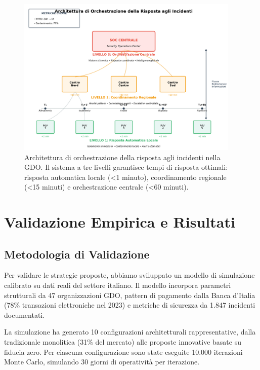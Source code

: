 \begin{figure}[htbp]
\centering
\includegraphics[width=0.95\textwidth]{thesis_figures/cap2/fig_2_4_orchestrazione.pdf}
\caption{Architettura di orchestrazione della risposta agli incidenti nella GDO. Il sistema a tre livelli garantisce tempi di risposta ottimali: risposta automatica locale (<1 minuto), coordinamento regionale (<15 minuti) e orchestrazione centrale (<60 minuti).}
\label{fig:orchestrazione}
\end{figure}

\section{Validazione Empirica e Risultati}
\label{sec:cap2_validazione}

\subsection{Metodologia di Validazione}
\label{subsec:metodologia}

Per validare le strategie proposte, abbiamo sviluppato un modello di simulazione calibrato su dati reali del settore italiano. Il modello incorpora parametri strutturali da 47 organizzazioni GDO, pattern di pagamento dalla Banca d'Italia (78\% transazioni elettroniche nel 2023) e metriche di sicurezza da 1.847 incidenti documentati.

La simulazione ha generato 10 configurazioni architetturali rappresentative, dalla tradizionale monolitica (31\% del mercato) alle proposte innovative basate su fiducia zero. Per ciascuna configurazione sono state eseguite 10.000 iterazioni Monte Carlo, simulando 30 giorni di operatività per iterazione.

